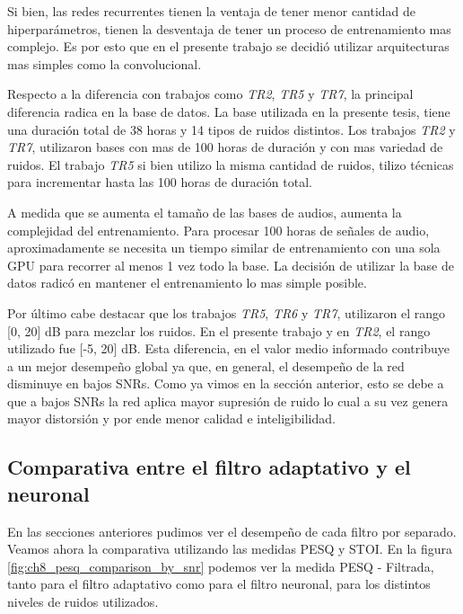 Si bien, las redes recurrentes tienen la ventaja de tener menor cantidad de hiperparámetros, tienen la desventaja de tener un proceso de entrenamiento mas complejo. Es por esto que en el presente trabajo se decidió utilizar arquitecturas mas simples como la convolucional.

Respecto a la diferencia con trabajos como \emph{TR2}, \emph{TR5} y \emph{TR7}, la principal diferencia radica en la base de datos. La base utilizada en la presente tesis, tiene una duración total de 38 horas y 14 tipos de ruidos distintos. Los trabajos \emph{TR2} y \emph{TR7}, utilizaron bases con mas de 100 horas de duración y con mas variedad de ruidos. El trabajo \emph{TR5} si bien utilizo la misma cantidad de ruidos, tilizo técnicas para incrementar hasta las 100 horas de duración total. 

A medida que se aumenta el tamaño de las bases de audios, aumenta la complejidad del entrenamiento. Para procesar 100 horas de señales de audio, aproximadamente se necesita un tiempo similar de entrenamiento con una sola GPU para recorrer al menos 1 vez todo la base. La decisión de utilizar la base de datos \cite{a_scalable_noisy_speech_dataset_and_online_subjective_test_framework} radicó en mantener el entrenamiento lo mas simple posible.

Por último cabe destacar que los trabajos \emph{TR5}, \emph{TR6} y \emph{TR7}, utilizaron el rango [0, 20] dB para mezclar los ruidos. En el presente trabajo y en \emph{TR2}, el rango utilizado fue [-5, 20] dB. Esta diferencia, en el valor medio informado contribuye a un mejor desempeño global ya que, en general, el desempeño de la red disminuye en bajos SNRs. Como ya vimos en la sección anterior, esto se debe a que a bajos SNRs la red aplica mayor supresión de ruido lo cual a su vez genera mayor distorsión y por ende menor calidad e inteligibilidad.

\subsection{Comparativa entre el filtro adaptativo y el neuronal}

En las secciones anteriores pudimos ver el desempeño de cada filtro por separado. Veamos ahora la comparativa utilizando las medidas PESQ y STOI. En la figura \ref{fig:ch8_pesq_comparison_by_snr} podemos ver la medida PESQ - Filtrada, tanto para el filtro adaptativo como para el filtro neuronal, para los distintos niveles de ruidos utilizados.

